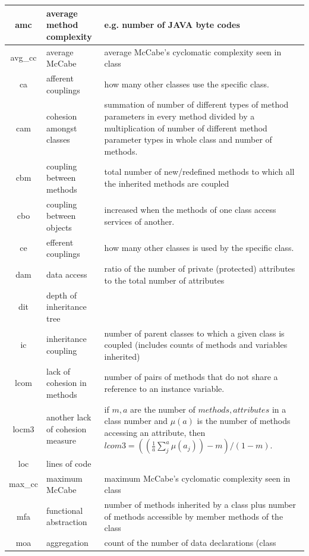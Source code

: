 \documentclass{sig-alternative}
\begin{document}
\begin{table}[t]
\renewcommand{\baselinestretch}{0.8}\begin{center}
{\scriptsize
\begin{tabular}{c|l|p{4.7in}}
amc & average method complexity & e.g. number of JAVA byte codes\\\hline
avg\_cc & average McCabe & average McCabe's cyclomatic complexity seen
in class\\\hline
ca & afferent couplings & how many other classes use the specific
class. \\\hline
cam & cohesion amongst classes & summation of number of different
types of method parameters in every method divided by a multiplication
of number of different method parameter types in whole class and
number of methods. \\\hline
cbm &coupling between methods &  total number of new/redefined methods
to which all the inherited methods are coupled\\\hline
cbo & coupling between objects & increased when the methods of one
class access services of another.\\\hline
ce & efferent couplings & how many other classes is used by the
specific class. \\\hline
dam & data access & ratio of the number of private (protected)
attributes to the total number of attributes\\\hline
dit & depth of inheritance tree &\\\hline
ic & inheritance coupling &  number of parent classes to which a given
class is coupled (includes counts of methods and variables inherited)
\\\hline
lcom & lack of cohesion in methods &number of pairs of methods that do
not share a reference to an instance variable.\\\hline
locm3 & another lack of cohesion measure & if $m,a$ are  the number of
$methods,attributes$
in a class number and $\mu(a)$  is the number of methods accessing an
attribute, 
then
$lcom3=((\frac{1}{a} \sum_j^a \mu(a_j)) - m)/ (1-m)$.
\\\hline
loc & lines of code &\\\hline
max\_cc & maximum McCabe & maximum McCabe's cyclomatic complexity seen
in class\\\hline
mfa & functional abstraction & number of methods inherited by a class
plus number of methods accessible by member methods of the
class\\\hline
moa &  aggregation &  count of the number of data declarations (class

\end{tabular}}
\end{center}
\end{table}
\end{document}
